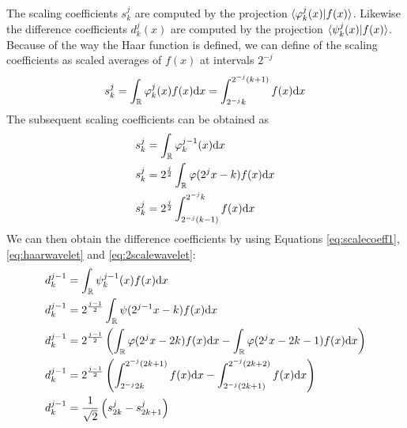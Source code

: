 \documentclass[../master_thesis.tex]{subfiles}
\begin{document}
The scaling coefficients $s^j_k$ are computed by the projection $\braket{\varphi^j_k(x)|f(x)}$.
Likewise the difference coefficients $d^j_k(x)$ are computed by the projection \newline$\braket{\psi^j_k(x)|f(x)}$.
Because of the way the Haar function is defined, we can define of the scaling coefficients as
scaled averages of $f(x)$ at intervals $2^{-j}$ \cite{Sorland, Beylkin:MRA}
\begin{equation}
  s^j_k = \int_{\mathbb{R}}\varphi^j_k(x)f(x)\text{d}x = \int^{2^{-j}(k + 1)}_{2^{-j}k} f(x) \text{d}x\label{eq:scalecoeff1}
\end{equation}
The subsequent scaling coefficients can be obtained as
\begin{align}
  \begin{split}\label{eq:scalecoeffint}
    s^{j}_k &= \int_{\mathbb{R}}\varphi^{j-1}_k(x)\text{d}x\\
    s^{j}_k &= 2^{\frac{j}{2}}\int_{\mathbb{R}}\varphi(2^{j}x - k)f(x)\text{d}x\\
    s^{j}_k &= 2^{\frac{j}{2}}\int_{2^{-j}(k-1)}^{2^{-j}k}f(x)\text{d}x\\
  \end{split}
\end{align}
We can then obtain the difference coefficients by using Equations \ref{eq:scalecoeff1}, \ref{eq:haarwavelet} and \ref{eq:2scalewavelet}:
\begin{align}
  \begin{split}\label{eq:diffcoeffint}
    d^{j - 1}_k &= \int_{\mathbb{R}}\psi^{j-1}_k(x)f(x)\text{d}x\\
    d^{j - 1}_k &= 2^{\frac{j - 1}{2}}\int_{\mathbb{R}}\psi(2^{j-1}x - k)f(x)\text{d}x\\
    d^{j - 1}_k &= 2^{\frac{j - 1}{2}}\left(\int_{\mathbb{R}}\varphi(2^jx - 2k)f(x)\text{d}x  - \int_{\mathbb{R}}\varphi(2^jx - 2k - 1)f(x)\text{d}x\right)\\
    d^{j - 1}_k &= 2^{\frac{j - 1}{2}}\left( \int^{2^{-j}(2k+1)}_{2^{-j}2k}f(x)\text{d}x - \int^{2^{-j}(2k+2)}_{2^{-j}(2k + 1)}f(x)\text{d}x \right)\\
    d^{j - 1}_k &= \frac{1}{\sqrt{2}}\left(s^{j}_{2k} - s^{j}_{2k+1} \right)
  \end{split}
\end{align}
\end{document}
